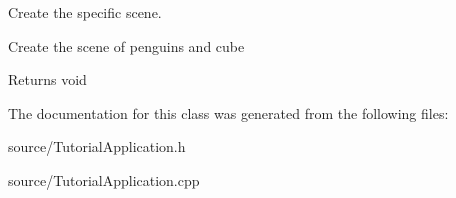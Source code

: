 Create the specific scene. 

Create the scene of penguins and cube

\begin{DoxyReturn}{Returns}
void 
\end{DoxyReturn}


The documentation for this class was generated from the following files\+:\begin{DoxyCompactItemize}
\item 
source/Tutorial\+Application.\+h\item 
source/Tutorial\+Application.\+cpp\end{DoxyCompactItemize}
